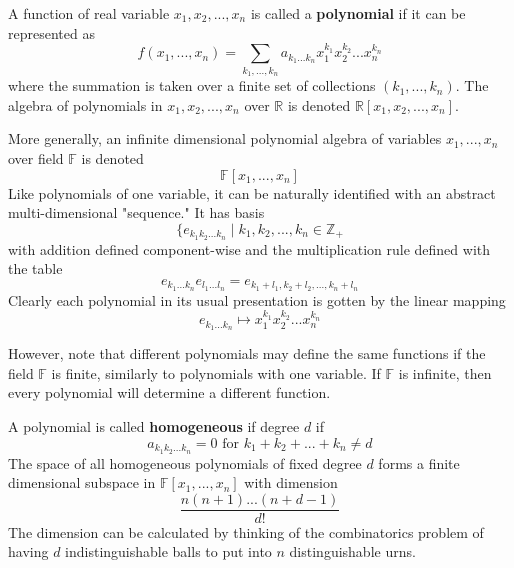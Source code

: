      \begin{definition}
        A function of real variable $x_1, x_2, ..., x_n$ is called a \textbf{polynomial} if it can be represented as 
        \begin{equation}
          f(x_1, ..., x_n) =  \sum_{k_1, ..., k_n} a_{k_1 ... k_n} x_1^{k_1} x_2^{k_2} ... x_n^{k_n}
        \end{equation}
        where the summation is taken over a finite set of collections $(k_1, ..., k_n)$. The algebra of polynomials in $x_1, x_2, ..., x_n$ over $\mathbb{R}$ is denoted $\mathbb{R}[x_1, x_2, ..., x_n]$. 
      \end{definition}

      \begin{definition}
        More generally, an infinite dimensional polynomial algebra of variables $x_1, ..., x_n$ over field $\mathbb{F}$ is denoted
        \begin{equation}
          \mathbb{F}[x_1, ..., x_n]
        \end{equation}
        Like polynomials of one variable, it can be naturally identified with an abstract multi-dimensional "sequence." It has basis 
        \begin{equation}
          \{e_{k_1 k_2 ... k_n} \;|\; k_1, k_2, ..., k_n \in \mathbb{Z}_+
        \end{equation}
        with addition defined component-wise and the multiplication rule defined with the table
        \begin{equation}
          e_{k_1...k_n} e_{l_1 ... l_n} = e_{k_1 + l_1, k_2 + l_2, ..., k_n + l_n}
        \end{equation}
        Clearly each polynomial in its usual presentation is gotten by the linear mapping
        \begin{equation}
          e_{k_1 ... k_n} \mapsto x_1^{k_1} x_2^{k_2} ... x_n^{k_n}
        \end{equation}
      \end{definition}

      However, note that different polynomials may define the same functions if the field $\mathbb{F}$ is finite, similarly to polynomials with one variable. If $\mathbb{F}$ is infinite, then every polynomial will determine a different function. 

      \begin{definition}
        A polynomial is called \textbf{homogeneous} if degree $d$ if 
        \begin{equation}
          a_{k_1 k_2 ... k_n} = 0 \text{ for } k_1 + k_2 + ... + k_n \neq d
        \end{equation}
        The space of all homogeneous polynomials of fixed degree $d$ forms a finite dimensional subspace in $\mathbb{F}[x_1, ..., x_n]$ with dimension 
        \begin{equation}
          \frac{n(n+1)...(n+d-1)}{d!}
        \end{equation}
        The dimension can be calculated by thinking of the combinatorics problem of having $d$ indistinguishable balls to put into $n$ distinguishable urns. 
      \end{definition}

